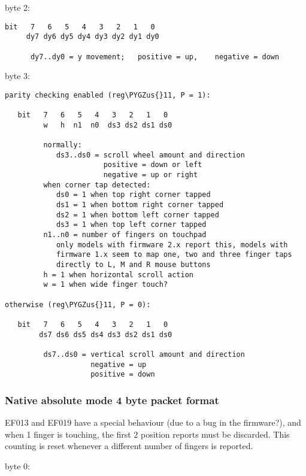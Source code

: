 \documentclass[a4paper,8pt,english]{sphinxmanual}
\def\PYGZus{\char`\_}
\begin{document}
byte 2:

\begin{Verbatim}[commandchars=\\\{\}]
bit   7   6   5   4   3   2   1   0
     dy7 dy6 dy5 dy4 dy3 dy2 dy1 dy0

      dy7..dy0 = y movement;   positive = up,    negative = down
\end{Verbatim}

byte 3:

\begin{Verbatim}[commandchars=\\\{\}]
parity checking enabled (reg\PYGZus{}11, P = 1):

   bit   7   6   5   4   3   2   1   0
         w   h  n1  n0  ds3 ds2 ds1 ds0

         normally:
            ds3..ds0 = scroll wheel amount and direction
                       positive = down or left
                       negative = up or right
         when corner tap detected:
            ds0 = 1 when top right corner tapped
            ds1 = 1 when bottom right corner tapped
            ds2 = 1 when bottom left corner tapped
            ds3 = 1 when top left corner tapped
         n1..n0 = number of fingers on touchpad
            only models with firmware 2.x report this, models with
            firmware 1.x seem to map one, two and three finger taps
            directly to L, M and R mouse buttons
         h = 1 when horizontal scroll action
         w = 1 when wide finger touch?

otherwise (reg\PYGZus{}11, P = 0):

   bit   7   6   5   4   3   2   1   0
        ds7 ds6 ds5 ds4 ds3 ds2 ds1 ds0

         ds7..ds0 = vertical scroll amount and direction
                    negative = up
                    positive = down
\end{Verbatim}


\subsubsection{Native absolute mode 4 byte packet format}
\label{input/devices/elantech:native-absolute-mode-4-byte-packet-format}
EF013 and EF019 have a special behaviour (due to a bug in the firmware?), and
when 1 finger is touching, the first 2 position reports must be discarded.
This counting is reset whenever a different number of fingers is reported.

byte 0:
\end{document}
